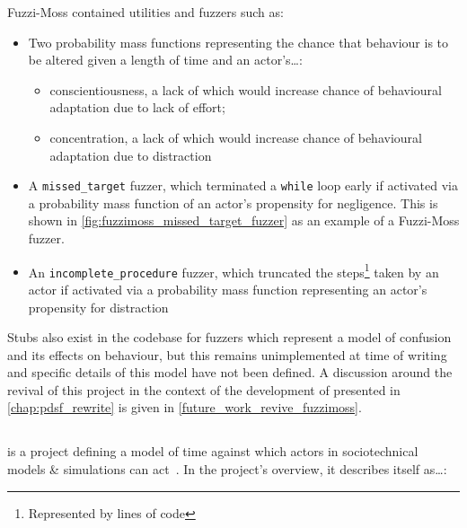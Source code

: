Fuzzi-Moss contained utilities and fuzzers such as:

\begin{itemize}
    \item Two probability mass functions representing the chance that
    behaviour is to be altered given a length of time and an actor's\ldots{}:
    \begin{itemize}
        \item conscientiousness, a lack of which would increase chance of behavioural adaptation due to lack
    of effort;
        \item concentration, a lack of which would increase chance of behavioural
    adaptation due to distraction
    \end{itemize}
    \item A \lstinline{missed_target} fuzzer, which terminated a
    \lstinline{while} loop early if activated via a probability mass function of
    an actor's propensity for negligence. This is shown in
    \cref{fig:fuzzimoss_missed_target_fuzzer} as an example of a Fuzzi-Moss
    fuzzer.
    \item An \lstinline{incomplete_procedure} fuzzer, which truncated the
    steps\footnote{Represented by lines of code} taken by an actor if activated
    via a probability mass function representing an actor's propensity for
    distraction
\end{itemize}

Stubs also exist in the \pydysofu{} codebase for fuzzers which represent a model of
confusion and its effects on behaviour, but this remains unimplemented at time
of writing and specific details of this model have not been defined. A
discussion around the revival of this project in the context of the development
of \pdsfthree presented in \cref{chap:pdsf_rewrite} is given in
\cref{future_work_revive_fuzzimoss}. 


\subsection{\theatreag{}}\label{subsec:prior_work_theatre}

\theatreag{} is a project defining a model of time against which actors in
sociotechnical models \& simulations can act~\cite{theatre_ag_repo}. In the
project's overview, it describes itself as\ldots{}:

